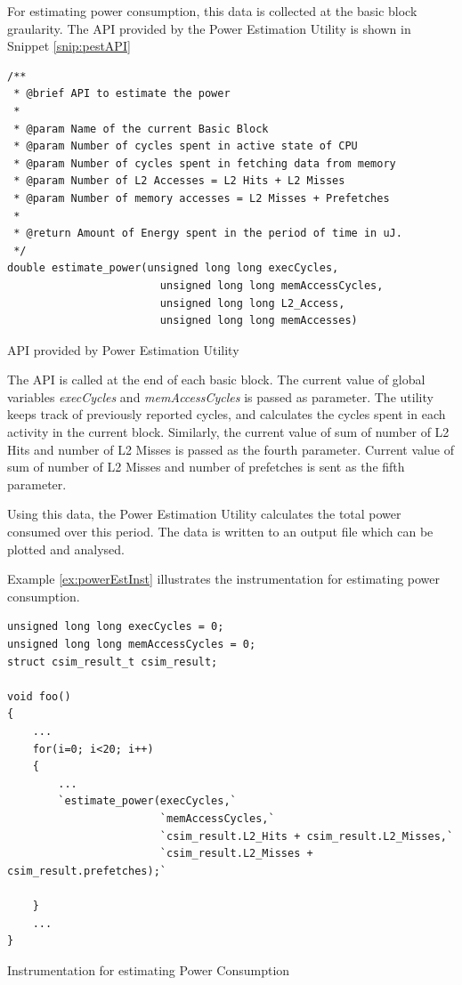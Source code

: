 For estimating power consumption, this data is collected at the basic block graularity. The API provided by the Power Estimation Utility is shown in Snippet \ref{snip:pestAPI}

\vspace*{10pt}
\begin{Snippet}[h]
\begin{lstlisting}[numbers=none]
/**
 * @brief API to estimate the power
 *
 * @param Name of the current Basic Block
 * @param Number of cycles spent in active state of CPU
 * @param Number of cycles spent in fetching data from memory
 * @param Number of L2 Accesses = L2 Hits + L2 Misses
 * @param Number of memory accesses = L2 Misses + Prefetches
 *
 * @return Amount of Energy spent in the period of time in uJ.
 */
double estimate_power(unsigned long long execCycles,
                		unsigned long long memAccessCycles,
                		unsigned long long L2_Access,
                		unsigned long long memAccesses)
\end{lstlisting}
\caption{API provided by Power Estimation Utility}
\label{snip:pestAPI}
\end{Snippet}

The API is called at the end of each basic block. The current value of global variables \emph{execCycles} and \emph{memAccessCycles} is passed as parameter. The utility keeps track of previously reported cycles, and calculates the cycles spent in each activity in the current block. Similarly, the current value of sum of number of L2 Hits and number of L2 Misses is passed as the fourth parameter. Current value of sum of number of L2 Misses and number of prefetches is sent as the fifth parameter.

Using this data, the Power Estimation Utility calculates the total power consumed over this period. The data is written to an output file which can be plotted and analysed.

Example \ref{ex:powerEstInst} illustrates the instrumentation for estimating power consumption.

\vspace*{10pt}
\begin{Example}[h!]
\begin{lstlisting}
unsigned long long execCycles = 0;
unsigned long long memAccessCycles = 0;
struct csim_result_t csim_result;

void foo()
{
    ...
    for(i=0; i<20; i++)
    {
        ...
        `estimate_power(execCycles,`
                        `memAccessCycles,`
                        `csim_result.L2_Hits + csim_result.L2_Misses,`
                        `csim_result.L2_Misses + csim_result.prefetches);`

    }
    ...
}
\end{lstlisting}
\caption{Instrumentation for estimating Power Consumption}
\label{ex:powerEstInst}
\end{Example}
